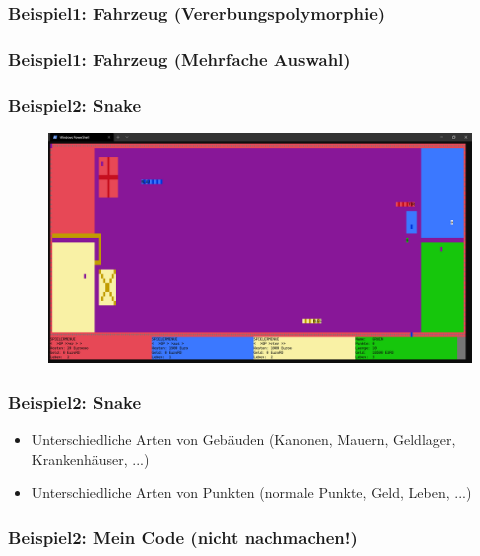 \begin{frame}
	\frametitle{Beispiel1: Fahrzeug (Vererbungspolymorphie)}
	{\tiny\UseRawInputEncoding{}}
\end{frame}


\begin{frame}
	\frametitle{Beispiel1: Fahrzeug (Mehrfache Auswahl)}
	{\tiny\UseRawInputEncoding{}}
\end{frame}


\begin{frame}
	\frametitle{Beispiel2: Snake}
	\begin{figure}[H]
		\includegraphics[width=\textwidth]{polymorphie/universell/vererbung/beispiele/snake/snake.png}
	\end{figure}
\end{frame}


\begin{frame}
	\frametitle{Beispiel2: Snake}
	\begin{itemize}
		\item Unterschiedliche Arten von Gebäuden (Kanonen, Mauern, Geldlager, Krankenhäuser, ...)
		\item Unterschiedliche Arten von Punkten (normale Punkte, Geld, Leben, ...)
	\end{itemize}
\end{frame}


\begin{frame}
	\frametitle{Beispiel2: Mein Code (nicht nachmachen!)}
	{\tiny\UseRawInputEncoding{}}
\end{frame}

